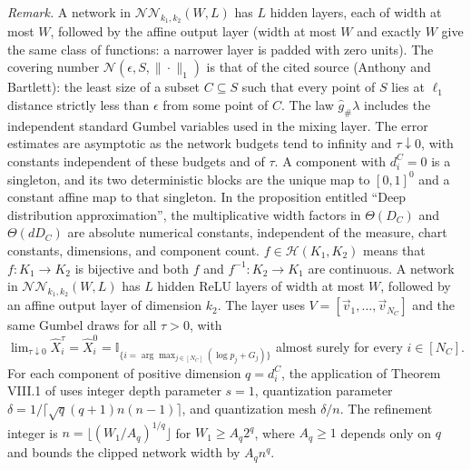 \noindent\textit{Remark.} A network in $\mathcal{NN}_{k_1,k_2}(W,L)$ has $L$ hidden layers, each of width at most $W$, followed by the affine output layer (width at most $W$ and exactly $W$ give the same class of functions: a narrower layer is padded with zero units). The covering number $\mathcal{N}(\epsilon,S,\|\cdot\|_1)$ is that of the cited source (Anthony and Bartlett): the least size of a subset $C\subseteq S$ such that every point of $S$ lies at $\ell_1$ distance strictly less than $\epsilon$ from some point of $C$. The law $\hat g_{\#}\lambda$ includes the independent standard Gumbel variables used in the mixing layer. The error estimates are asymptotic as the network budgets tend to infinity and $\tau\downarrow0$, with constants independent of these budgets and of $\tau$. A component with $d_i^C=0$ is a singleton, and its two deterministic blocks are the unique map to $[0,1]^0$ and a constant affine map to that singleton. In the proposition entitled ``Deep distribution approximation'', the multiplicative width factors in $\Theta(D_C)$ and $\Theta(dD_C)$ are absolute numerical constants, independent of the measure, chart constants, dimensions, and component count. $f\in\mathcal{H}(K_1,K_2)$ means that $f:K_1\rightarrow K_2$ is bijective and both $f$ and $f^{-1}:K_2\rightarrow K_1$ are continuous. A network in $\mathcal{NN}_{k_1,k_2}(W,L)$ has $L$ hidden ReLU layers of width at most $W$, followed by an affine output layer of dimension $k_2$. The layer uses $V=[\Vec{v}_1,\ldots,\Vec{v}_{N_C}]$ and the same Gumbel draws for all $\tau>0$, with $\lim_{\tau\downarrow0}\hat{X}^{\tau}_i=\hat{X}^{0}_i=\mathbb{I}_{\{i=\arg\max_{j\in[N_C]}(\log p_j+G_j)\}}$ almost surely for every $i\in[N_C]$. For each component of positive dimension $q=d_i^C$, the application of Theorem VIII.1 of \cite{perekrestenkoHighDimensionalDistributionGeneration2022a} uses integer depth parameter $s=1$, quantization parameter $\delta=1/\lceil\sqrt q(q+1)n(n-1)\rceil$, and quantization mesh $\delta/n$. The refinement integer is $n=\lfloor(W_1/A_q)^{1/q}\rfloor$ for $W_1\geqslant A_q2^q$, where $A_q\geqslant1$ depends only on $q$ and bounds the clipped network width by $A_qn^q$.

